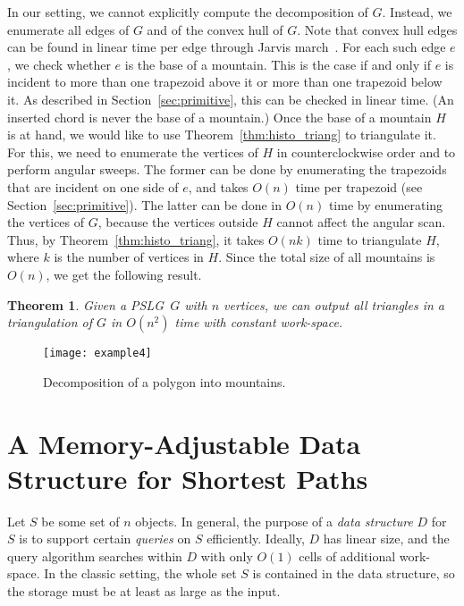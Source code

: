 \documentclass[11pt,a4paper]{article}
\newtheorem{theorem}{Theorem}[section]
\newcommand{\histogram}{mountain}
\newcommand{\pslg}{PSLG}
\begin{document}
In our setting, we cannot explicitly compute the decomposition of $G$.
Instead, we enumerate all edges of $G$ and of the convex hull of
$G$. Note that convex hull edges can be found
in linear time per edge through Jarvis march~\cite{s-chc-04}.
For each such edge $e$, we check whether $e$ is the  base of a
\histogram{}.
This is the case if and only if
$e$ is incident to more than one trapezoid above it or more than
one trapezoid below  it.
As described in Section~\ref{sec:primitive}, this can
be checked in linear time.
(An inserted chord is never the base of a \histogram.)
Once the base of a \histogram{} $H$ is at hand, we would like to
use Theorem~\ref{thm:histo_triang} to triangulate it.
For this, we need  to enumerate the
vertices of $H$ in counterclockwise order and to perform
angular sweeps. The former can be done by enumerating the trapezoids
that are incident on one side of $e$, and takes $O(n)$ time
per trapezoid (see Section~\ref{sec:primitive}).
The latter can be done in $O(n)$ time by enumerating the vertices of $G$, because
the vertices outside $H$ cannot affect the angular scan.
Thus, by Theorem~\ref{thm:histo_triang}, it takes $O(nk)$ time to triangulate
$H$, where $k$ is the number of vertices in $H$.
Since the total size of
all \histogram s is $O(n)$, we get the following result.

\begin{theorem}
Given a \pslg\ $G$ with $n$ vertices,
we can output all triangles in a triangulation of $G$ in $O(n^2)$
time with constant work-space.
\end{theorem}

\begin{figure}
\begin{center}
\texttt{[image: example4]}
\end{center}
\caption{Decomposition of a polygon into \histogram s.}
\label{fig:histo_decomp}
\end{figure}


\section{A Memory-Adjustable Data Structure for Shortest Paths}\label{sec:memadj}

Let $S$ be some set of $n$ objects.
In general, the purpose of a \emph{data structure} $D$ for
$S$ is to support certain \emph{queries} on
$S$ efficiently.
Ideally, $D$ has linear size,
and the query algorithm searches within $D$ with only $O(1)$ cells of
additional work-space.
In the classic setting, the whole set $S$ is contained in the
data structure,
so the storage must be at least as large as the input.
\end{document}
